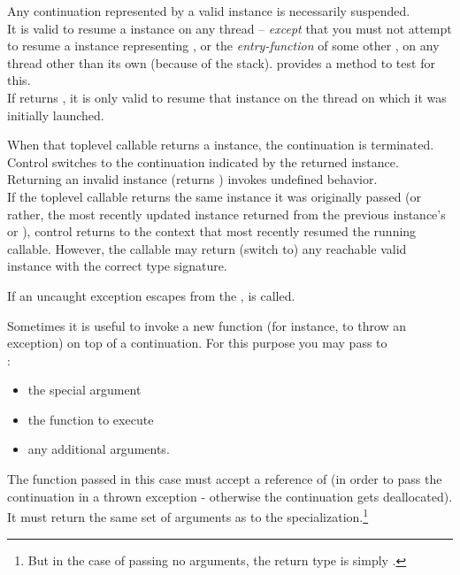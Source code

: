 Any continuation represented by a valid \cont instance is necessarily suspended.\\
It is valid to resume a \cont instance on any thread -- \emph{except} that you
must not attempt to resume a \cont instance representing \main, or
the \emph{entry-function} of some other , on any thread other
than its own (because of the stack). \cont provides a method to test for this.\\
If  returns , it is
only valid to resume that \cont instance on the thread on which it was initially
launched.


When that toplevel callable returns a \cont instance, the continuation is
terminated. Control switches to the continuation indicated by the returned \cont
instance.\\
Returning an invalid \cont instance (\opbool returns ) invokes
undefined behavior.\\
If the toplevel callable returns the same \cont instance it was originally
passed (or rather, the most recently updated instance returned from the
previous instance's \call or \resume), control returns to the context that most
recently resumed the running callable. However, the callable may return (switch
to) any reachable valid \cont instance with the correct type signature.


\label{subsec:exceptions}
If an uncaught exception escapes from the \entryfn,  is
called.


Sometimes it is useful to invoke a new function (for instance, to throw an
exception) on top of a continuation. For this purpose you may pass to\\
:

\begin{itemize}
  \item the special argument 
  \item the function to execute
  \item any additional arguments.
\end{itemize}

The function passed in this case must accept a reference of \cont (in order to
pass the continuation in a thrown exception - otherwise the continuation gets
deallocated). It must return the same set of arguments as to the
\resume specialization.\footnote{But in the case of passing no arguments, the
return type is simply .}\\

